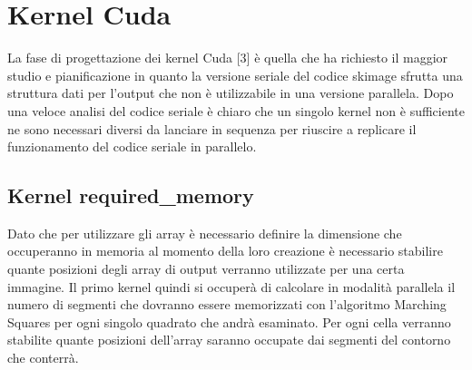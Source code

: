 \documentclass[12pt,a4paper]{report}
\begin{document}
\section{Kernel Cuda}
La fase di progettazione dei kernel Cuda [3] è quella che ha richiesto il maggior studio e pianificazione in quanto la versione seriale del codice skimage sfrutta una struttura dati per l'output che non è utilizzabile in una versione parallela. \newline
Dopo una veloce analisi del codice seriale è chiaro che un singolo kernel non è sufficiente ne sono necessari diversi da lanciare in sequenza per riuscire a replicare il funzionamento del codice seriale in parallelo. 
\subsection{Kernel required\_memory}
Dato che per utilizzare gli array è necessario definire la dimensione che occuperanno in memoria al momento della loro creazione è necessario stabilire quante posizioni degli array di output verranno utilizzate per una certa immagine. \newline 
Il primo kernel quindi si occuperà di calcolare in modalità parallela il numero di segmenti che dovranno essere memorizzati con l'algoritmo Marching Squares per ogni singolo quadrato che andrà esaminato.
Per ogni cella verranno stabilite quante posizioni dell'array saranno occupate dai segmenti del contorno che conterrà. \\[10pt]
\end{document}
